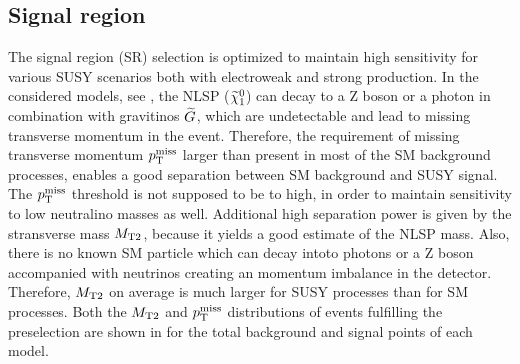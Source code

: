 \subsection{Signal region}\label{sec:SRSelection}
The signal region (SR) selection is optimized to maintain high sensitivity for various SUSY scenarios both with electroweak and strong production. In the considered models, see , the NLSP ($\widetilde{\chi}^{0}_{1}$) can decay to a Z boson or a photon in combination with gravitinos $\widetilde{G}$, which are undetectable and lead to missing transverse momentum in the event. Therefore, the requirement of missing transverse momentum $p_{\mathrm{T}}^\text{miss}$ larger than present in most of the SM background processes, enables a good separation between SM background and SUSY signal. The $p_{\mathrm{T}}^\text{miss}$ threshold is not supposed to be to high, in order to maintain sensitivity to low neutralino masses as well.
Additional high separation power is given by the stransverse mass $M_{\mathrm{T2}}$, because it yields a good estimate of the NLSP mass. Also, there is no known SM particle which can decay intoto photons or a Z boson accompanied with neutrinos creating an momentum imbalance in the detector. Therefore, $M_{\mathrm{T2}}$ on average is much larger for SUSY processes than for SM processes. Both the $M_{\mathrm{T2}}$ and $p_{\mathrm{T}}^\text{miss}$ distributions of events fulfilling the preselection are shown in  for the total background and signal points of each model.
